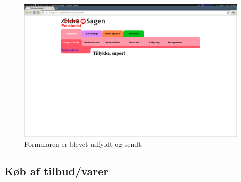\begin{figure}[h]
    \centering
    \includegraphics[width=.9\textwidth]{billeder/opgave1_trin4.png}
    \caption{Formularen er blevet udfyldt og sendt.}
    \label{fig:opg1_trin4}
\end{figure}

\subsection{Køb af tilbud/varer}


